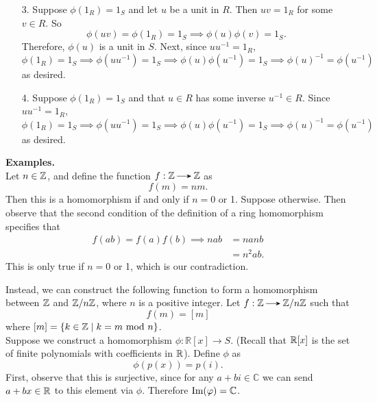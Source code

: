 \begin{prf}
\begin{itemize}
            \item[3.] Suppose $\phi(1_R) = 1_S$ and 
            let $u$ be a unit in $R$. Then $uv =
            1_R$ for some $v \in R$. So 
            \[
                \phi(uv) = \phi(1_R) = 1_S \implies \phi(u)\phi(v) = 1_S.        
            \]
            Therefore, $\phi(u)$ is a unit in $S$. Next, since $uu^{-1} =
            1_R$,
            \[
                \phi(1_R) = 1_S \implies \phi(uu^{-1}) = 1_S \implies 
                \phi(u)\phi(u^{-1}) = 1_S \implies \phi(u)^{-1} = \phi(u^{-1})
            \]
            as desired.
            
            \item[4.] Suppose $\phi(1_R) = 1_S$ and that $u \in R$ has
            some inverse $u^{-1} \in R$.
            Since $uu^{-1} = 1_R$,
            \[
                \phi(1_R) = 1_S \implies \phi(uu^{-1}) = 1_S \implies 
                \phi(u)\phi(u^{-1}) = 1_S \implies \phi(u)^{-1} = \phi(u^{-1})
            \]
            as desired.
            
        \end{itemize}
    \end{prf}

    

    \noindent\textbf{Examples.}\\
    Let $n \in \mathbb{Z}$, and define the function
    $f: \ZZ \to \ZZ$ as 
    \[
        f(m) = nm.
    \]
    Then this is a homomorphism if and only if $n = 0$ or 1.
    Suppose otherwise. Then observe that the second condition of
    the definition of a ring homomorphism specifies that 
    \begin{align*}
        f(ab) = f(a)f(b) \implies nab &= nanb \\
        & = n^2ab.
    \end{align*}
    This is only true if $n = 0$ or 1, which is our contradiction.

    Instead, we can construct the following function to form a
    homomorphism between $\mathbb{Z}$ and $\mathbb{Z}/n\mathbb{Z}$, where $n$ is a
    positive integer. Let $f: \ZZ \to \ZZ/n\ZZ$ such that 
    \[
        f(m) = [m]
    \]
    where $[m] = \{k \in \mathbb{Z} \mid k = m \mbox{ mod } n\}$.
    \\

    Suppose we construct a homomorphism $\phi: \mathbb{R}[x] \to
    S$. (Recall that $\mathbb{R}[x]$ is the set of finite polynomials
    with coefficients in $\mathbb{R}$). Define $\phi$ as  
    \[
        \phi(p(x)) = p(i).
    \]
    First, observe that this is surjective, since for any $a + bi
    \in \mathbb{C}$ we can send $a + bx \in \mathbb{R}$ to this element
    via $\phi$. Therefore $\mbox{Im}(\varphi) = \mathbb{C}$. 

